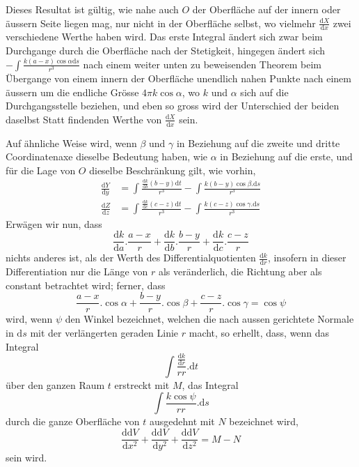 Dieses Resultat ist gültig, wie nahe auch $O$ der Oberfläche auf der innern oder äussern Seite liegen mag, nur nicht in der Oberfläche selbst, wo vielmehr $\frac{\mathrm{d}X}{\mathrm{d}x}$ zwei verschiedene Werthe haben wird. Das erste Integral ändert sich zwar beim Durchgange durch die Oberfläche nach der Stetigkeit, hingegen ändert sich $-\int\frac{k(a-x)\cos\alpha\mathrm{d}s}{r^3}$ nach einem weiter unten zu beweisenden Theorem beim Übergange von einem innern der Oberfläche unendlich nahen Punkte nach einem äussern um die endliche Grösse $4\pi k\cos\alpha$, wo $k$ und $\alpha$ sich auf die Durchgangsstelle beziehen, und eben so gross wird der Unterschied der beiden daselbst Statt findenden Werthe von $\frac{\mathrm{d}X}{\mathrm{d}x}$ sein.

Auf ähnliche Weise wird, wenn $\beta$ und $\gamma$ in Beziehung auf die zweite und dritte Coordinatenaxe dieselbe Bedeutung haben, wie $\alpha$ in Beziehung auf die erste, und für die Lage von $O$ dieselbe Beschränkung gilt, wie vorhin,
\[
\begin{aligned}
\frac{\mathrm{d}Y}{\mathrm{d}y}&=\int\frac{\frac{\mathrm{d}k}{\mathrm{d}b}(b-y)\mathrm{d}t}{r^3}-\int\frac{k(b-y)\cos\beta.\mathrm{d}s}{r^3}\\
\frac{\mathrm{d}Z}{\mathrm{d}z}&=\int\frac{\frac{\mathrm{d}k}{\mathrm{d}c}(c-z)\mathrm{d}t}{r^3}-\int\frac{k(c-z)\cos\gamma.\mathrm{d}s}{r^3}
\end{aligned}
\]
Erwägen wir nun, dass
\[
\frac{\mathrm{d}k}{\mathrm{d}a}.\frac{a-x}{r}+\frac{\mathrm{d}k}{\mathrm{d}b}.\frac{b-y}{r}+\frac{\mathrm{d}k}{\mathrm{d}c}.\frac{c-z}{r}
\]
%
nichts anderes ist, als der Werth des Differentialquotienten $\frac{\mathrm{d}k}{\mathrm{d}r}$, insofern in dieser Differentiation nur die Länge von $r$ als veränderlich, die Richtung aber als constant betrachtet wird; ferner, dass
\[
\frac{a-x}{r}.\cos\alpha+\frac{b-y}{r}.\cos\beta+\frac{c-z}{r}.\cos\gamma=\cos\psi
\]
wird, wenn $\psi$ den Winkel bezeichnet, welchen die nach aussen gerichtete Normale in $\mathrm{d}s$ mit der verlängerten geraden Linie $r$ macht, so erhellt, dass, wenn das Integral
\[
\int\frac{\frac{\mathrm{d}k}{\mathrm{d}r}}{rr}.\mathrm{d}t
\]
über den ganzen Raum $t$ erstreckt mit $M$, das Integral
\[
\int\frac{k\cos\psi}{rr}.\mathrm{d}s
\]
durch die ganze Oberfläche von $t$ ausgedehnt mit $N$ bezeichnet wird,
\[
\frac{\mathrm{d}\mathrm{d}V}{\mathrm{d}x^2}+\frac{\mathrm{d}\mathrm{d}V}{\mathrm{d}y^2}+\frac{\mathrm{d}\mathrm{d}V}{\mathrm{d}z^2}=M-N
\]
sein wird.

